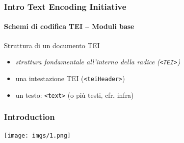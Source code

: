 \begin{frame}
	\frametitle{Intro Text Encoding Initiative}
	\framesubtitle{Schemi di codifica TEI – Moduli base}
	\addtocounter{nframe}{1}

	\begin{block}{Struttura di un documento TEI}
        \begin{itemize}
            \item \textit{struttura fondamentale all’interno della radice (\texttt{<TEI>})}
            \item una intestazione TEI (\texttt{<teiHeader>})
            \item un testo: \texttt{<text>} (o più testi, cfr. infra)
        \end{itemize}
    \end{block}
    
\end{frame}


\begin{frame}
    \frametitle{Introduction}
    \addtocounter{nframe}{1}
    
    \begin{center}
        \texttt{[image: imgs/1.png]}
    \end{center}

\end{frame}

 
